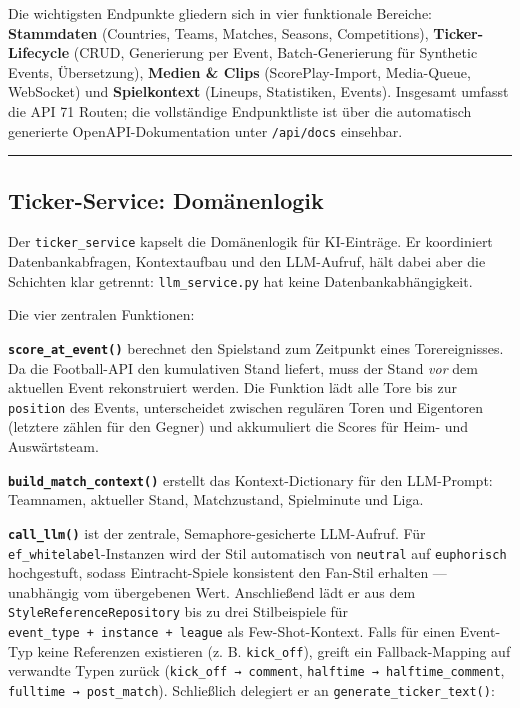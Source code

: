 Die wichtigsten Endpunkte gliedern sich in vier funktionale Bereiche:
\textbf{Stammdaten} (Countries, Teams, Matches, Seasons, Competitions),
\textbf{Ticker-Lifecycle} (CRUD, Generierung per Event,
Batch-Generierung für Synthetic Events, Übersetzung), \textbf{Medien \&
Clips} (ScorePlay-Import, Media-Queue, WebSocket) und
\textbf{Spielkontext} (Lineups, Statistiken, Events). Insgesamt umfasst
die API 71 Routen; die vollständige Endpunktliste ist über die
automatisch generierte OpenAPI-Dokumentation unter \texttt{/api/docs}
einsehbar.

\begin{center}\rule{0.5\linewidth}{0.5pt}\end{center}

\subsection{Ticker-Service:
Domänenlogik}\label{ticker-service-domuxe4nenlogik}

Der \texttt{ticker\_service} kapselt die Domänenlogik für KI-Einträge.
Er koordiniert Datenbankabfragen, Kontextaufbau und den LLM-Aufruf, hält
dabei aber die Schichten klar getrennt: \texttt{llm\_service.py} hat
keine Datenbankabhängigkeit.

Die vier zentralen Funktionen:

\textbf{\texttt{score\_at\_event()}} berechnet den Spielstand zum
Zeitpunkt eines Torereignisses. Da die Football-API den kumulativen
Stand liefert, muss der Stand \emph{vor} dem aktuellen Event
rekonstruiert werden. Die Funktion lädt alle Tore bis zur
\texttt{position} des Events, unterscheidet zwischen regulären Toren und
Eigentoren (letztere zählen für den Gegner) und akkumuliert die Scores
für Heim- und Auswärtsteam.

\textbf{\texttt{build\_match\_context()}} erstellt das
Kontext-Dictionary für den LLM-Prompt: Teamnamen, aktueller Stand,
Matchzustand, Spielminute und Liga.

\textbf{\texttt{call\_llm()}} ist der zentrale, Semaphore-gesicherte
LLM-Aufruf. Für \texttt{ef\_whitelabel}-Instanzen wird der Stil
automatisch von \texttt{neutral} auf \texttt{euphorisch} hochgestuft,
sodass Eintracht-Spiele konsistent den Fan-Stil erhalten --- unabhängig
vom übergebenen Wert. Anschließend lädt er aus dem
\texttt{StyleReferenceRepository} bis zu drei Stilbeispiele für
\texttt{event\_type\ +\ instance\ +\ league} als Few-Shot-Kontext. Falls
für einen Event-Typ keine Referenzen existieren (z. B.
\texttt{kick\_off}), greift ein Fallback-Mapping auf verwandte Typen
zurück (\texttt{kick\_off\ →\ comment},
\texttt{halftime\ →\ halftime\_comment},
\texttt{fulltime\ →\ post\_match}). Schließlich delegiert er an
\texttt{generate\_ticker\_text()}:

